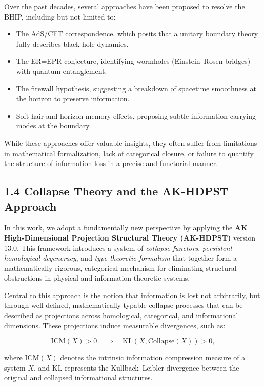 \documentclass[11pt]{article}
\begin{document}
Over the past decades, several approaches have been proposed to resolve the BHIP, including but not limited to:

\begin{itemize}
    \item The AdS/CFT correspondence, which posits that a unitary boundary theory fully describes black hole dynamics.
    \item The ER=EPR conjecture, identifying wormholes (Einstein–Rosen bridges) with quantum entanglement.
    \item The firewall hypothesis, suggesting a breakdown of spacetime smoothness at the horizon to preserve information.
    \item Soft hair and horizon memory effects, proposing subtle information-carrying modes at the boundary.
\end{itemize}

While these approaches offer valuable insights, they often suffer from limitations in mathematical formalization, lack of categorical closure, or failure to quantify the structure of information loss in a precise and functorial manner.

\subsection*{1.4 Collapse Theory and the AK-HDPST Approach}

In this work, we adopt a fundamentally new perspective by applying the \textbf{AK High-Dimensional Projection Structural Theory (AK-HDPST)} version 13.0. This framework introduces a system of \textit{collapse functors}, \textit{persistent homological degeneracy}, and \textit{type-theoretic formalism} that together form a mathematically rigorous, categorical mechanism for eliminating structural obstructions in physical and information-theoretic systems.

Central to this approach is the notion that information is lost not arbitrarily, but through well-defined, mathematically typable collapse processes that can be described as projections across homological, categorical, and informational dimensions. These projections induce measurable divergences, such as:

\[
\mathrm{ICM}(X) > 0 \quad \Rightarrow \quad \mathrm{KL}(X, \mathrm{Collapse}(X)) > 0,
\]

where \(\mathrm{ICM}(X)\) denotes the intrinsic information compression measure of a system \(X\), and \(\mathrm{KL}\) represents the Kullback–Leibler divergence between the original and collapsed informational structures.
\end{document}
